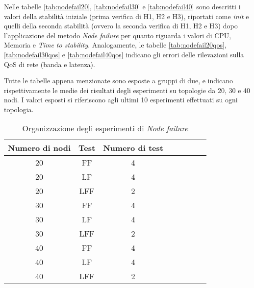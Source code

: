          Nelle tabelle \ref{tab:nodefail20}, \ref{tab:nodefail30} e \ref{tab:nodefail40}  sono descritti i valori della stabilità iniziale (prima verifica di H1, H2 e H3), riportati come \textit{init} e quelli della seconda stabilità (ovvero la seconda verifica di H1, H2 e H3) dopo l'applicazione del metodo \textit{Node failure} per quanto riguarda i valori di CPU, Memoria e \textit{Time to stability}. Analogamente, le tabelle \ref{tab:nodefail20qos}, \ref{tab:nodefail30qos} e \ref{tab:nodefail40qos} indicano gli errori delle rilevazioni sulla QoS di rete (banda e latenza). 
        
        Tutte le tabelle appena menzionate sono esposte a gruppi di due, e indicano rispettivamente le medie dei risultati degli esperimenti su topologie da 20, 30 e 40 nodi. I valori esposti si riferiscono agli ultimi 10 esperimenti effettuati su ogni topologia.
        \newpage
        
        \begin{table}[H]
            \caption{Organizzazione degli esperimenti di \textit{Node failure}}
            \label{tab:nodefail}
            \begin{center}
                \begin{tabular}{|c|c|c|c|c|c|c|c|}
                      \hline
                    Numero di nodi & Test & Numero di test\\
                    \hline
                    20 & FF & 4 \\
 
                    20 & LF & 4 \\

                    20 & LFF & 2 \\
                    \hline
                    30 & FF & 4 \\

                    30 & LF & 4 \\

                    30 & LFF & 2 \\
                    \hline
                    40 & FF & 4 \\

                    40 & LF & 4 \\

                    40 & LFF & 2 \\
                    \hline
                \end{tabular}
            \end{center}
        \end{table}
        
